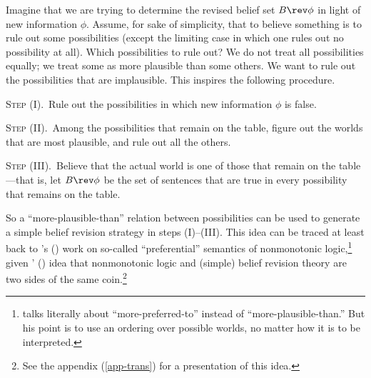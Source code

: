 Imagine that we are trying to determine the revised belief set $B \rev \phi$ in light of new information $\phi$. Assume, for sake of simplicity, that to believe something is to rule out some possibilities (except the limiting case in which one rules out no possibility at all). Which possibilities to rule out? We do not treat all possibilities equally; we treat some as more plausible than some others. We want to rule out the possibilities that are implausible. This inspires the following procedure. \op

	\xm \textsc{Step (I).}\, Rule out the possibilities in which new information $\phi$ is false.
	
	\xm \textsc{Step (II).}\, Among the possibilities that remain on the table, figure out the worlds that are most plausible, and rule out all the others.
	
	\xm \textsc{Step (III).}\, Believe that the actual world is one of those that remain on the table---that is, let $B \rev \phi$ be the set of sentences that are true in every possibility that remains on the table. 

\ed So a ``more-plausible-than'' relation between possibilities can be used to generate a simple belief revision strategy in steps (I)--(III). This idea can be traced at least back to \citeauthor{shoham1987semantical}'s () work on so-called ``preferential'' semantics of nonmonotonic logic,\footnote
	{\citet{shoham1987semantical} talks literally about ``more-preferred-to'' instead of ``more-plausible-than.'' But his point is to use an ordering over possible worlds, no matter how it is to be interpreted.} 
given \citeauthor{makinson1991relations}' () idea that nonmonotonic logic and (simple) belief revision theory are two sides of the same coin.\footnote
{See the appendix (\autoref{app-trans}) for a presentation of this idea.}

